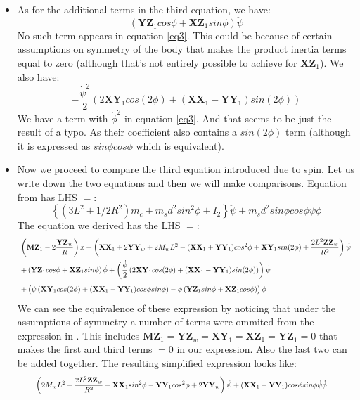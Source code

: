 \documentclass[a4paper,10pt]{article}
\newcommand\scalemath[2]{\scalebox{#1}{\mbox{\ensuremath{\displaystyle #2}}}}
\begin{document}
\begin{itemize}
\item As for the additional terms in the third equation, we have:
\[
 (\mathbf{YZ}_1cos\phi+\mathbf{XZ}_1sin\phi)\ddot\psi
\]
No such term appears in equation \ref{eq3}. This could be because of certain assumptions on symmetry of the body that makes the
product inertia terms equal to zero (although that's not entirely possible to achieve for $\mathbf{XZ}_1$).
We also have:
\[
 -\frac{\dot{\psi}^2}{2}\left(2\mathbf{XY}_1cos(2\phi)+(\mathbf{XX}_1-\mathbf{YY}_1)sin(2\phi)\right)
\]
We have a term with $\dot \phi^2$ in equation \ref{eq3}. And that seems to be just the result of a typo. As their coefficient also
contains a $sin(2\phi)$ term (although it is expressed as $sin\phi cos\phi$ which is equivalent).


\item Now we proceed to compare the third equation introduced due to spin. Let us write down the two equations and then we will make 
comparisons. Equation from \cite{kim2005dynamic} has LHS $=$:
\[
 \left\lbrace(3L^2+1/2R^2)m_c+m_sd^2sin^2\phi+I_2\right\rbrace\ddot{\psi}+m_sd^2sin\phi cos\phi\dot{\psi}\dot{\phi}
\]
The equation we derived has the LHS $=$:
\begin{align}\begin{split} 
&\scalemath{0.75}{\left(\mathbf{MZ}_1-2\frac{\mathbf{YZ}_w}{R}\right)\ddot{x} + \left(\mathbf{XX}_1+2\mathbf{YY}_w+2M_wL^2-(\mathbf{XX}_1+\mathbf{YY}_1)cos^2\phi+\mathbf{XY}_1sin(2\phi)+\frac{2L^2\mathbf{ZZ}_w}{R^2}\right)\ddot{\psi}} \\
&\scalemath{0.75}{+\left(\mathbf{YZ}_1cos\phi+\mathbf{XZ}_1sin\phi\right)\ddot{\phi} + \left(\frac{\dot{\phi}}{2}\left(2\mathbf{XY}_1cos(2\phi)+(\mathbf{XX}_1-\mathbf{YY}_1)sin(2\phi)\right)\right)\dot\psi} \\
&\scalemath{0.75}{+\left(\dot\psi\left(\mathbf{XY}_1cos(2\phi)+(\mathbf{XX}_1-\mathbf{YY}_1)cos\phi sin\phi\right)-\dot\phi\left(\mathbf{YZ}_1sin\phi+\mathbf{XZ}_1cos\phi\right)\right)\dot\phi }
\end{split} \end{align}
We can see the equivalence of these expression by noticing that under the assumptions of symmetry a number of terms were ommited from the
expression in \cite{kim2005dynamic}. This includes $\mathbf{MZ}_1 = \mathbf{YZ}_w = \mathbf{XY}_1 = \mathbf{XZ}_1 = \mathbf{YZ}_1 = 0$ that makes the first 
and third terms $=0$ in our expression. Also the last two can be added together. The resulting simplified expression looks like:
\begin{align}\begin{split} 
&\scalemath{0.75}{\left(2M_wL^2+\frac{2L^2\mathbf{ZZ}_w}{R^2}+\mathbf{XX}_1sin^2\phi-\mathbf{YY}_1cos^2\phi+2\mathbf{YY}_w\right)\ddot{\psi}+(\mathbf{XX}_1-\mathbf{YY}_1)cos\phi sin\phi\dot\psi\dot\phi}
\end{split} \end{align}


\end{itemize}
\end{document}
